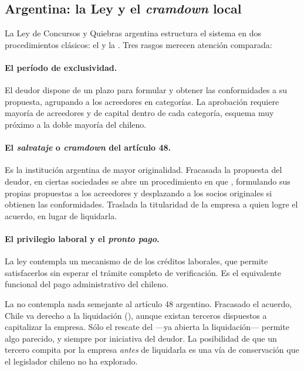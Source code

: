 \bloqueNormativo

\subsection{Argentina: la Ley  y el \emph{cramdown} local}

La Ley de Concursos y Quiebras argentina estructura el sistema en dos procedimientos clásicos: el
 y la . Tres rasgos merecen atención comparada:

\paragraph{El período de exclusividad.} El deudor dispone de un plazo para formular y obtener las
conformidades a su propuesta, agrupando a los acreedores en categorías. La aprobación requiere
mayoría de acreedores y de capital dentro de cada categoría, esquema muy próximo a la doble mayoría
del  chileno.

\paragraph{El \emph{salvataje} o \emph{cramdown} del artículo 48.} Es la institución argentina de
mayor originalidad. Fracasada la propuesta del deudor, en ciertas sociedades se abre un
procedimiento en que ,
formulando sus propias propuestas a los acreedores y desplazando a los socios originales si
obtienen las conformidades. Traslada la titularidad de la empresa a quien logre el acuerdo, en
lugar de liquidarla.

\paragraph{El privilegio laboral y el \emph{pronto pago}.} La ley contempla un mecanismo de
 de los créditos laborales, que permite satisfacerlos sin esperar el trámite
completo de verificación. Es el equivalente funcional del pago administrativo del 
chileno.

\begin{alerta}
La \LIR{} no contempla nada semejante al artículo 48 argentino. Fracasado el acuerdo, Chile va
derecho a la liquidación (), aunque existan terceros dispuestos a capitalizar la empresa.
Sólo el rescate del  ---ya abierta la liquidación--- permite algo parecido, y siempre por
iniciativa del deudor. La posibilidad de que un tercero compita por la empresa \emph{antes} de
liquidarla es una vía de conservación que el legislador chileno no ha explorado.
\end{alerta}

